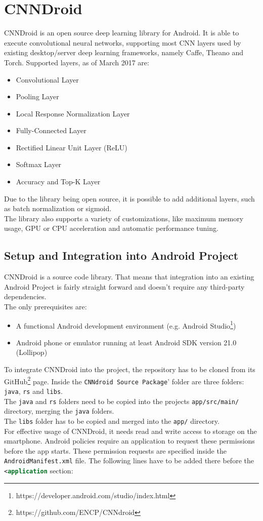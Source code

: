 \section{CNNDroid}
CNNDroid is an open source deep learning library for Android. It is able to execute convolutional neural networks, supporting most CNN layers used by existing desktop/server deep learning frameworks, namely Caffe, Theano and Torch. Supported layers, as of March 2017 are:
\begin{itemize}
    \item{Convolutional Layer}
    \item{Pooling Layer}
    \item{Local Response Normalization Layer}
    \item{Fully-Connected Layer}
    \item{Rectified Linear Unit Layer (ReLU)}
    \item{Softmax Layer}
    \item{Accuracy and Top-K Layer}
\end{itemize}
Due to the library being open source, it is possible to add additional layers, such as batch normalization or sigmoid.\\
The library also supports a variety of customizations, like maximum memory usage, GPU or CPU acceleration and automatic performance tuning.

\subsection{Setup and Integration into Android Project}
CNNDroid is a source code library. That means that integration into an existing Android Project is fairly straight forward and doesn't require any third-party dependencies.\\
The only prerequisites are:
\begin{itemize}
    \item{A functional Android development environment (e.g. Android Studio\footnote{https://developer.android.com/studio/index.html})}
    \item{Android phone or emulator running at least Android SDK version 21.0 (Lollipop)}
\end{itemize}

To integrate CNNDroid into the project, the repository has to be cloned from its GitHub\footnote{https://github.com/ENCP/CNNdroid} page. Inside the \texttt{CNNdroid Source Package}' folder are three folders: \texttt{java}, \texttt{rs} and \texttt{libs}.\\
The \texttt{java} and \texttt{rs} folders need to be copied into the projects \texttt{app/src/main/} directory, merging the \texttt{java} folders.\\
The \texttt{libs} folder has to be copied and merged into the \texttt{app/} directory.\\
For effective usage of CNNDroid, it needs read and write access to storage on the smartphone. Android policies require an application to request these permissions before the app starts. These permission requests are specified inside the \texttt{AndroidManifest.xml} file. The following lines have to be added there before the \lstinline[language=XML]{<application} section:

